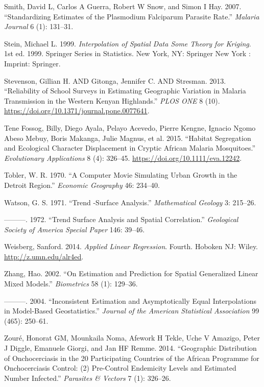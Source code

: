 \documentclass[
  letterpaper,
]{krantz}
\newlength{\cslhangindent}
\newlength{\cslentryspacingunit} %
\newenvironment{CSLReferences}[2] %
 {%
  \setlength{\parindent}{0pt}
  \ifodd #1
  \let\oldpar\par
  \def\par{\hangindent=\cslhangindent\oldpar}
  \fi
  \setlength{\parskip}{#2\cslentryspacingunit}
 }%
 {}
\begin{document}
\begin{CSLReferences}{1}{0}
\leavevmode{}%
Smith, David L, Carlos A Guerra, Robert W Snow, and Simon I Hay. 2007.
{``Standardizing Estimates of the Plasmodium Falciparum Parasite
Rate.''} \emph{Malaria Journal} 6 (1): 131--31.

\leavevmode{}%
Stein, Michael L. 1999. \emph{Interpolation of Spatial Data Some Theory
for Kriging}. 1st ed. 1999. Springer Series in Statistics. New York, NY:
Springer New York : Imprint: Springer.

\leavevmode{}%
Stevenson, Gillian H. AND Gitonga, Jennifer C. AND Stresman. 2013.
{``Reliability of School Surveys in Estimating Geographic Variation in
Malaria Transmission in the Western Kenyan Highlands.''} \emph{PLOS ONE}
8 (10). \url{https://doi.org/10.1371/journal.pone.0077641}.

\leavevmode{}%
Tene Fossog, Billy, Diego Ayala, Pelayo Acevedo, Pierre Kengne, Ignacio
Ngomo Abeso Mebuy, Boris Makanga, Julie Magnus, et al. 2015. {``Habitat
Segregation and Ecological Character Displacement in Cryptic African
Malaria Mosquitoes.''} \emph{Evolutionary Applications} 8 (4): 326--45.
\url{https://doi.org/10.1111/eva.12242}.

\leavevmode{}%
Tobler, W. R. 1970. {``A Computer Movie Simulating Urban Growth in the
Detroit Region.''} \emph{Economic Geography} 46: 234--40.

\leavevmode{}%
Watson, G. S. 1971. {``Trend -Surface Analysis.''} \emph{Mathematical
Geology} 3: 215--26.

\leavevmode{}%
---------. 1972. {``Trend Surface Analysis and Spatial Correlation.''}
\emph{Geological Society of America Special Paper} 146: 39--46.

\leavevmode{}%
Weisberg, Sanford. 2014. \emph{Applied Linear Regression}. Fourth.
Hoboken {NJ}: Wiley. \url{http://z.umn.edu/alr4ed}.

\leavevmode{}%
Zhang, Hao. 2002. {``On Estimation and Prediction for Spatial
Generalized Linear Mixed Models.''} \emph{Biometrics} 58 (1): 129--36.

\leavevmode{}%
---------. 2004. {``Inconsistent Estimation and Asymptotically Equal
Interpolations in Model-Based Geostatistics.''} \emph{Journal of the
American Statistical Association} 99 (465): 250--61.

\leavevmode{}%
Zouré, Honorat GM, Mounkaila Noma, Afework H Tekle, Uche V Amazigo,
Peter J Diggle, Emanuele Giorgi, and Jan HF Remme. 2014. {``Geographic
Distribution of Onchocerciasis in the 20 Participating Countries of the
African Programme for Onchocerciasis Control: (2) Pre-Control Endemicity
Levels and Estimated Number Infected.''} \emph{Parasites \& Vectors} 7
(1): 326--26.

\end{CSLReferences}
\end{document}

